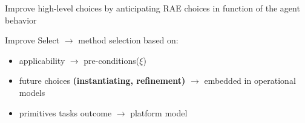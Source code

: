 \begin{frame}{Improve high-level choices by anticipating RAE choices in function of the agent behavior}

    Improve Select $\rightarrow$ method selection based on:
    \begin{itemize}
        \pause
        \item applicability $\rightarrow$ pre-conditions($\xi$)
        \pause
        \item future choices \textbf{(instantiating, refinement)}
        \pause
        $\rightarrow$ embedded in operational models
        \item primitives tasks outcome $\rightarrow$ platform model
    \end{itemize}

\end{frame}
